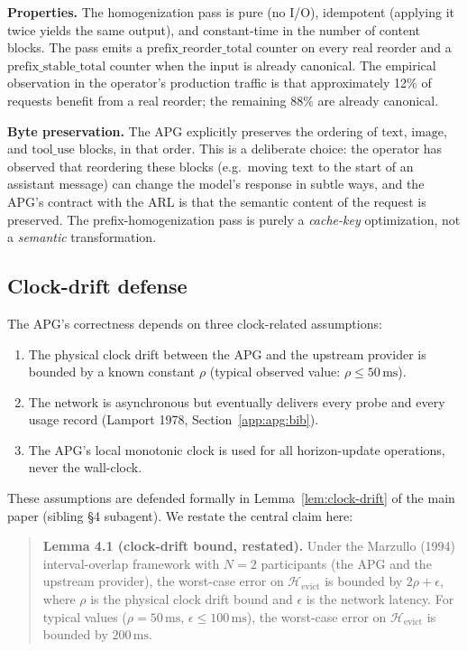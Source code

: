 \noindent
\textbf{Properties.} The homogenization pass is pure (no I/O),
idempotent (applying it twice yields the same output), and
constant-time in the number of content blocks. The pass emits a
$\mathrm{prefix\_reorder\_total}$ counter on every real reorder and
a $\mathrm{prefix\_stable\_total}$ counter when the input is
already canonical. The empirical observation in the operator's
production traffic is that approximately 12\% of requests benefit
from a real reorder; the remaining 88\% are already canonical.

\noindent
\textbf{Byte preservation.} The APG explicitly preserves the
ordering of $\mathrm{text}$, $\mathrm{image}$, and
$\mathrm{tool\_use}$ blocks, in that order. This is a deliberate
choice: the operator has observed that reordering these blocks
(e.g.\ moving $\mathrm{text}$ to the start of an assistant
message) can change the model's response in subtle ways, and the
APG's contract with the ARL is that the semantic content of the
request is preserved. The prefix-homogenization pass is purely a
\emph{cache-key} optimization, not a \emph{semantic}
transformation.

\subsection{Clock-drift defense}
\label{app:apg:clock}

The APG's correctness depends on three clock-related assumptions:
\begin{enumerate}
  \item The physical clock drift between the APG and the upstream
        provider is bounded by a known constant $\rho$ (typical
        observed value: $\rho \le 50\,\mathrm{ms}$).
  \item The network is asynchronous but eventually delivers every
        probe and every usage record (Lamport 1978,
        Section~\ref{app:apg:bib}).
  \item The APG's local monotonic clock is used for all
        horizon-update operations, never the wall-clock.
\end{enumerate}

\noindent
These assumptions are defended formally in
Lemma~\ref{lem:clock-drift} of the main paper (sibling §4
subagent). We restate the central claim here:

\begin{quote}
\textbf{Lemma 4.1 (clock-drift bound, restated).}
Under the Marzullo (1994) interval-overlap framework with
$N=2$ participants (the APG and the upstream provider), the
worst-case error on $\mathcal{H}_{\text{evict}}$ is bounded by
$2\rho + \epsilon$, where $\rho$ is the physical clock drift
bound and $\epsilon$ is the network latency. For typical values
($\rho = 50\,\mathrm{ms}$, $\epsilon \le 100\,\mathrm{ms}$),
the worst-case error on $\mathcal{H}_{\text{evict}}$ is bounded by
$200\,\mathrm{ms}$.
\end{quote}

